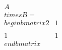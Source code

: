 \documentclass[preview]{standalone}
\begin{document}
\begin{align*}
A \\times B = \\begin{bmatrix} 2 & 1 \\\\ 1 & 1 \\end{bmatrix}
\end{align*}
\end{document}
